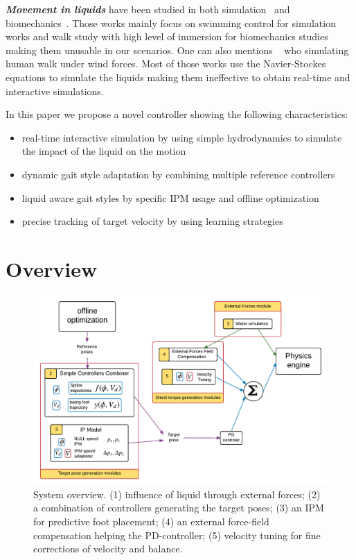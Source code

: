\documentclass[conference]{acmsiggraph}
\begin{document}
\textbf{\textit{Movement in liquids}} have been studied in both simulation~\cite{yang2004layered,si2014realistic} and biomechanics~\cite{barela2006biomechanical,chevutschi2009comparison}. Those works mainly focus on swimming control for simulation works and walk study with high level of immersion for biomechanics studies making them unusable in our scenarios. One can also mentions ~\cite{lentine2011creature} who simulating human walk under wind forces. Most of those works use the Navier-Stockes equations to simulate the liquids making them ineffective to obtain real-time and interactive simulations.

In this paper we propose a novel controller showing the following characteristics:
\begin{itemize}
\item{real-time interactive simulation by using simple hydrodynamics to simulate the impact of the liquid on the motion}
\item{dynamic gait style adaptation by combining multiple reference controllers}
\item{liquid aware gait styles by specific IPM usage and offline optimization}
\item{precise tracking of target velocity by using learning strategies}
\end{itemize}

\section{Overview}
\label{sec:overview}

\begin{figure}[t]
\centering
\includegraphics[scale=0.45]{images/general_process.pdf}
\caption{System overview. (1) influence of liquid through external forces; (2) a combination of controllers generating the target poses; (3) an IPM for predictive foot placement; (4) an external force-field compensation helping the PD-controller; (5) velocity tuning for fine corrections of velocity and balance.}
\label{fig:shema_controler}
\end{figure}
\end{document}
